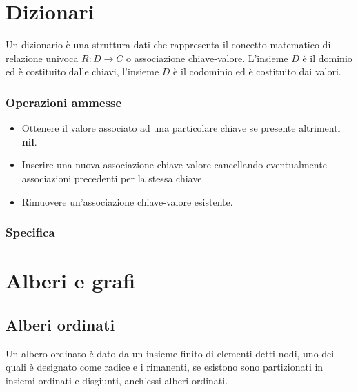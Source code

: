 \section{Dizionari}
Un dizionario \`e una struttura dati che rappresenta il concetto matematico di relazione univoca $R:D\rightarrow C$ o associazione chiave-valore. L'insieme
$D$ \`e il dominio ed \`e costituito dalle chiavi, l'insieme $D$ \`e il codominio ed \`e costituito dai valori.
\subsubsection{Operazioni ammesse}
\begin{itemize}
\item Ottenere il valore associato ad una particolare chiave se presente altrimenti \textbf{nil}.
\item Inserire una nuova associazione chiave-valore cancellando eventualmente associazioni precedenti per la stessa chiave.
\item Rimuovere un'associazione chiave-valore esistente.
\end{itemize}
\subsubsection{Specifica}
\begin{algorithm}
\DontPrintSemicolon
{}

\caption{\protect\Dictionary}

\Item {}\;
\;
\;
\end{algorithm}
\section{Alberi e grafi}
\subsection{Alberi ordinati}
Un albero ordinato \`e dato da un insieme finito di elementi detti nodi, uno dei quali \`e designato come radice e i rimanenti, se esistono sono 
partizionati in insiemi ordinati e disgiunti, anch'essi alberi ordinati.
